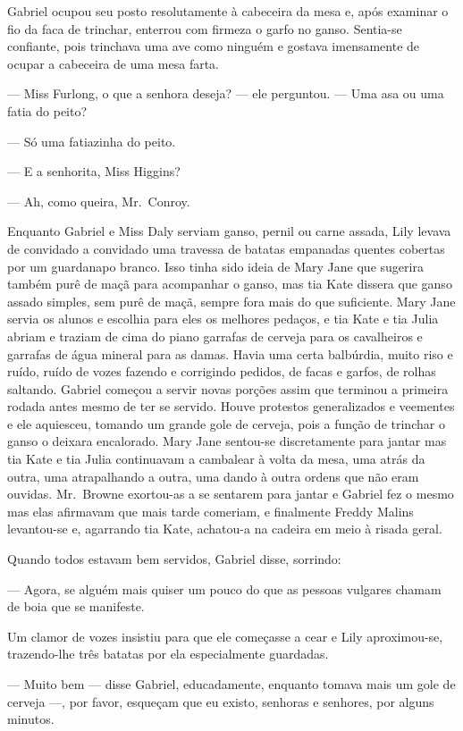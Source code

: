 Gabriel ocupou seu posto resolutamente à cabeceira da mesa e, após examinar o
fio da faca de trinchar, enterrou com firmeza o garfo no ganso.  Sentia-se
confiante, pois trinchava uma ave como ninguém e gostava imensamente de ocupar
a cabeceira de uma mesa farta.

--- Miss Furlong, o que a senhora deseja? --- ele perguntou.  --- Uma asa ou
uma fatia do peito?

--- Só uma fatiazinha do peito.

--- E a senhorita, Miss Higgins?

--- Ah, como queira, Mr.~Conroy.

Enquanto Gabriel e Miss Daly serviam ganso, pernil ou carne assada, Lily levava
de convidado a convidado uma travessa de batatas empanadas quentes cobertas por
um guardanapo branco.  Isso tinha sido ideia de Mary Jane que sugerira também
purê de maçã para acompanhar o ganso, mas tia Kate dissera que ganso assado
simples, sem purê de maçã, sempre fora mais do que suficiente.  Mary Jane
servia os alunos e escolhia para eles os melhores pedaços, e tia Kate e tia
Julia abriam e traziam de cima do piano garrafas de cerveja para os cavalheiros
e garrafas de água mineral para as damas.  Havia uma certa balbúrdia, muito
riso e ruído, ruído de vozes fazendo e corrigindo pedidos, de facas e garfos,
de rolhas saltando.  Gabriel começou a servir novas porções assim que terminou
a primeira rodada antes mesmo de ter se servido.  Houve protestos generalizados
e veementes e ele aquiesceu, tomando um grande gole de cerveja, pois a função
de trinchar o ganso o deixara encalorado.  Mary Jane sentou-se discretamente
para jantar mas tia Kate e tia Julia continuavam a cambalear à volta da mesa,
uma atrás da outra, uma atrapalhando a outra, uma dando à outra ordens que não
eram ouvidas.  Mr.~Browne exortou-as a se sentarem para jantar e Gabriel fez o
mesmo mas elas afirmavam que mais tarde comeriam, e finalmente Freddy Malins
levantou-se e, agarrando tia Kate, achatou-a na cadeira em meio à risada geral.

Quando todos estavam bem servidos, Gabriel disse, sorrindo:

--- Agora, se alguém mais quiser um pouco do que as pessoas vulgares chamam de
boia que se manifeste.

Um clamor de vozes insistiu para que ele começasse a cear e Lily aproximou-se,
trazendo-lhe três batatas por ela especialmente guardadas.

--- Muito bem --- disse Gabriel, educadamente, enquanto tomava mais um gole de
cerveja ---, por favor, esqueçam que eu existo, senhoras e senhores, por alguns
minutos.

